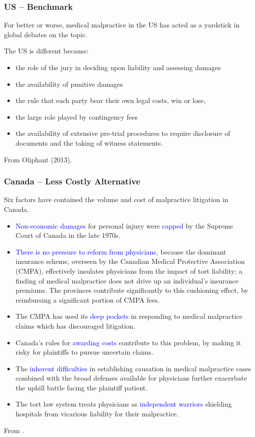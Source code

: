 \documentclass[serif,10pt]{beamer}
\begin{document}
\begin{frame}
\frametitle{US -- Benchmark}
For better or worse, medical malpractice in the US has acted as a yardstick in global debates on the topic.

The US is different because:
  \begin{itemize}
  \item the role of the jury in deciding upon liability and assessing damages
\item the availability of punitive damages
\item the rule that each party bear their own legal costs, win or lose,
\item the large role played by contingency fees
\item the availability of extensive pre-trial procedures to require disclosure of documents and the taking of witness statements.
\end{itemize}
From \textcolor{bleudefrance}{Oliphant (2013)}.
\end{frame}

\begin{frame}[shrink=20]
\frametitle{Canada -- Less Costly Alternative}
Six factors have contained the volume and cost of malpractice litigation in Canada.
  \begin{itemize}
\item \textcolor{blue}{Non-economic damages} for personal injury were \textcolor{blue}{capped} by the Supreme Court of Canada in the late 1970s.
\item \textcolor{blue}{There is no pressure to reform from physicians}, because the dominant insurance scheme, overseen by the Canadian Medical Protective Association (CMPA), effectively insulates physicians from the impact of tort liability; a finding of medical malpractice does not drive up an individual's insurance premiums. The provinces contribute significantly to this cushioning effect, by reimbursing a significant portion of CMPA fees.
\item The CMPA has used its \textcolor{blue}{deep pockets} in responding to medical malpractice claims which has discouraged litigation.
\item Canada's rules for \textcolor{blue}{awarding costs} contribute to this problem, by making it risky for plaintiffs to pursue uncertain claims.
\item The \textcolor{blue}{inherent difficulties} in establishing causation in medical malpractice cases combined with the broad defenses available for physicians further exacerbate the uphill battle facing the plaintiff patient.
\item The tort law system treats physicians as \textcolor{blue}{independent warriors} shielding hospitals from vicarious liability for their malpractice.
\end{itemize}
From \cite{flood2011canadian}.
\end{frame}
\end{document}
